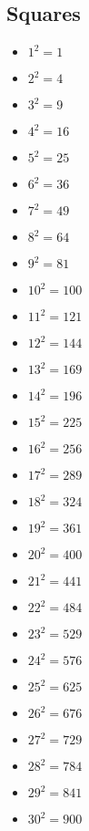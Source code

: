 \begin{multicols}{2}
\section{Squares}
\begin{itemize}
    \item \(1^{2} = 1\)
    \item \(2^{2} = 4\)
    \item \(3^{2} = 9\)
    \item \(4^{2} = 16\)
    \item \(5^{2} = 25\)
    \item \(6^{2} = 36\)
    \item \(7^{2} = 49\)
    \item \(8^{2} = 64\)
    \item \(9^{2} = 81\)
    \item \({10}^{2} = 100\)
    \item \({11}^{2} = 121\)
    \item \({12}^{2} = 144\)
    \item \({13}^{2} = 169\)
    \item \({14}^{2} = 196\)
    \item \({15}^{2} = 225\)
    \item \({16}^{2} = 256\)
    \item \({17}^{2} = 289\)
    \item \({18}^{2} = 324\)
    \item \({19}^{2} = 361\)
    \item \({20}^{2} = 400\)
    \item \({21}^{2} = 441\)
    \item \({22}^{2} = 484\)
    \item \({23}^{2} = 529\)
    \item \({24}^{2} = 576\)
    \item \({25}^{2} = 625\)
    \item \({26}^{2} = 676\)
    \item \({27}^{2} = 729\)
    \item \({28}^{2} = 784\)
    \item \({29}^{2} = 841\)
    \item \({30}^{2} = 900\)
\end{itemize}

\end{multicols}
